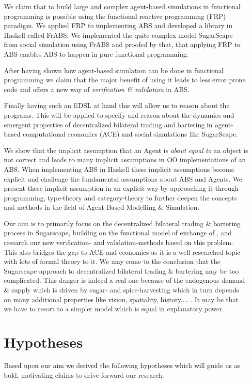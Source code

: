 We claim that to build large and complex agent-based simulations in functional programming is possible using the functional reactive programming (FRP) paradigm. We applied FRP to implementing ABS and developed a library in Haskell called FrABS. We implemented the quite complex model SugarScape from social simulation using FrABS and proofed by that, that applying FRP to ABS enables ABS to happen in pure functional programming.

After having shown how agent-based simulation can be done in functional programming we claim that the major benefit of using it leads to less error prone code and offers a new way of \textit{verification \& validation} in ABS. 

Finally having such an EDSL at hand this will allow us to reason about the programs. This will be applied to specify and reason about the dynamics and emergent properties of decentralized bilateral trading and bartering in agent-based computational economics (ACE) and social simulations like SugarScape.

We show that the implicit assumption that an Agent is \textit{about equal to} an object is not correct and leads to many implicit assumptions in OO implementations of an ABS. When implementing ABS in Haskell these implicit assumptions become explicit and challenge the fundamental assumptions about ABS and Agents. We present these implicit assumption in an explicit way by approaching it through programming, type-theory and category-theory to further deepen the concepts and methods in the field of Agent-Based Modelling \& Simulation.

Our aim is to primarily focus on the decentralized bilateral trading \& bartering process in Sugarscape, building on the functional model of exchange of \cite{botta_functional_2011}, and research our new verification- and validation-methods based on this problem. This also bridges the gap to ACE and economics as it is a well researched topic with lots of formal theory to it. We may come to the conclusion that the Sugarscape approach to decentralized bilateral trading \& bartering may be too complicated. This danger is indeed a real one because of the endogenous demand \& supply which is driven by sugar- and spice-harvesting which in turn depends on many additional properties like vision, spatiality, history,... . It may be that we have to resort to a simpler model which is equal in explanatory power.

\section{Hypotheses}
Based upon our aim we derived the following hypotheses which will guide us as bold, motivating claims to drive forward our research.

